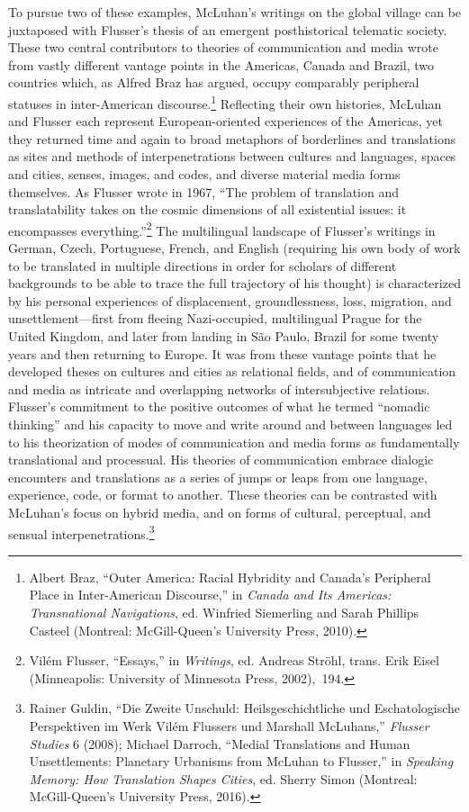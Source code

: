 \documentclass{tufte-handout}
\begin{document}
To pursue two of these examples, McLuhan's writings on the global
village can be juxtaposed with Flusser's thesis of an emergent
posthistorical telematic society. These two central contributors to
theories of communication and media wrote from vastly different vantage
points in the Americas, Canada and Brazil, two countries which, as
Alfred Braz has argued, occupy comparably peripheral statuses in
inter-American discourse.\footnote{Albert Braz, ``Outer America: Racial
  Hybridity and Canada's Peripheral Place in Inter-American Discourse,''
  in \emph{Canada and Its Americas: Transnational Navigations}, ed.
  Winfried Siemerling and Sarah Phillips Casteel (Montreal:
  McGill-Queen's University Press, 2010).} Reflecting their own
histories, McLuhan and Flusser each represent European-oriented
experiences of the Americas, yet they returned time and again to broad
metaphors of borderlines and translations as sites and methods of
interpenetrations between cultures and languages, spaces and cities,
senses, images, and codes, and diverse material media forms themselves.
As Flusser wrote in 1967, ``The problem of translation and
translatability takes on the cosmic dimensions of all existential
issues: it encompasses everything.''\footnote{Vilém Flusser, ``Essays,''
  in \emph{Writings}, ed. Andreas Ströhl, trans. Erik Eisel
  (Minneapolis: University of Minnesota Press, 2002),~194.} The
multilingual landscape of Flusser's writings in German, Czech,
Portuguese, French, and English (requiring his own body of work to be
translated in multiple directions in order for scholars of different
backgrounds to be able to trace the full trajectory of his thought) is
characterized by his personal experiences of displacement,
groundlessness, loss, migration, and unsettlement---first from fleeing
Nazi-occupied, multilingual Prague for the United Kingdom, and later
from landing in São Paulo, Brazil for some twenty years and then
returning to Europe. It was from these vantage points that he developed
theses on cultures and cities as relational fields, and of communication
and media as intricate and overlapping networks of intersubjective
relations. Flusser's commitment to the positive outcomes of what he
termed ``nomadic thinking'' and his capacity to move and write around
and between languages led to his theorization of modes of communication
and media forms as fundamentally translational and processual. His
theories of communication embrace dialogic encounters and translations
as a series of jumps or leaps from one language, experience, code, or
format to another. These theories can be contrasted with McLuhan's focus
on hybrid media, and on forms of cultural, perceptual, and sensual
interpenetrations.\footnote{Rainer Guldin, ``Die Zweite Unschuld:
  Heilsgeschichtliche und Eschatologische Perspektiven im Werk Vilém
  Flussers und Marshall McLuhans,'' \emph{Flusser Studies} 6 (2008);
  Michael Darroch, ``Medial Translations and Human Unsettlements:
  Planetary Urbanisms from McLuhan to Flusser,'' in \emph{Speaking
  Memory: How Translation Shapes Cities}, ed. Sherry Simon (Montreal:
  McGill-Queen's University Press, 2016).}
\end{document}
